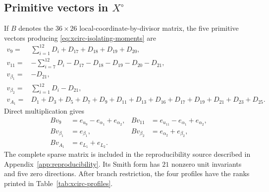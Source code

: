 \subsection[Primitive vectors in X-circ]{Primitive vectors in $X^{\circ}$}

If $B$ denotes the $36\times26$ local-coordinate-by-divisor matrix, the five
primitive vectors producing \eqref{eq:xcirc-isolating-moments} are
\begin{align}
 v_9={}&\sum_{i=1}^{12}D_i+D_{17}+D_{18}+D_{19}+D_{20},\nonumber\\
 v_{11}={}&-\sum_{i=7}^{12}D_i-D_{17}-D_{18}-D_{19}-D_{20}-D_{21},\nonumber\\
 v_{\beta_1}={}&-D_{21},\nonumber\\
 v_{\beta_2}={}&\sum_{i=1}^{12}D_i-D_{21},\nonumber\\
 v_{A_1}={}&D_1+D_3+D_5+D_7+D_9+D_{11}+D_{13}+D_{16}
 +D_{17}+D_{19}+D_{21}+D_{23}+D_{25}.
 \label{eq:app-xcirc-vectors}
\end{align}
Direct multiplication gives
\begin{align}
 Bv_9&=e_{u_9}-e_{\alpha_1}+e_{\alpha_2},&
 Bv_{11}&=e_{u_{11}}-e_{\alpha_1}+e_{\alpha_2},\nonumber\\
 Bv_{\beta_1}&=e_{\beta_1},&
 Bv_{\beta_2}&=e_{\alpha_2}+e_{\beta_2},\nonumber\\
 Bv_{A_1}&=e_{L_1}+e_{L_2}.
 \label{eq:app-xcirc-products}
\end{align}
The complete sparse matrix is included in the reproducibility source described
in Appendix~\ref{app:reproducibility}. Its Smith form has $21$ nonzero unit
invariants and five zero directions. After branch restriction, the four
profiles have the ranks printed in Table~\ref{tab:xcirc-profiles}.

